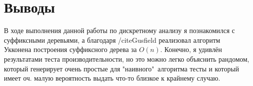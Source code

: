 \section{Выводы}

В ходе выполнения данной работы по дискретному анализу я познакомился с суффиксными деревьями, а благодаря /cite{Gusfield} реализовал
алгоритм Укконена построения суффиксного дерева за $O(n)$. Конечно, я удивлён результатами теста производительности, но это можно легко
объяснить рандомом, который генерирует очень простые для "наивного"\ алгоритма тесты и который имеет оч. малую вероятность выдать что-то
близкое к крайнему случаю.
\pagebreak
